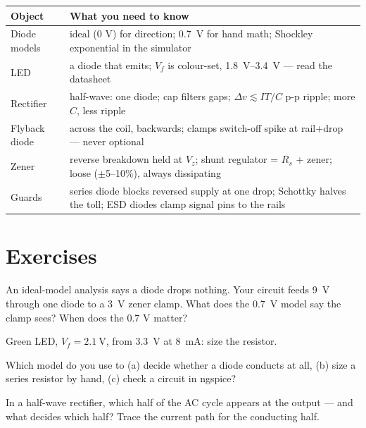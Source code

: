 \begin{center}
\begin{tabularx}{\textwidth}{l>{\raggedright\arraybackslash}X}
\toprule
\textbf{Object} & \textbf{What you need to know}\\
\midrule
Diode models & ideal (0 V) for direction; \qty{0.7}{\volt} for hand
math; Shockley exponential in the simulator \\
LED & a diode that emits; $V_f$ is colour-set,
\qty{1.8}{\volt}--\qty{3.4}{\volt} --- read the datasheet \\
Rectifier & half-wave: one diode; cap filters gaps;
$\Delta v\lesssim IT/C$ p-p ripple; more $C$, less ripple \\
Flyback diode & across the coil, backwards; clamps switch-off spike at
rail+drop --- never optional \\
Zener & reverse breakdown held at $V_z$; shunt regulator = $R_s$ +
zener; loose ($\pm$5--10\%), always dissipating \\
Guards & series diode blocks reversed supply at one drop; Schottky
halves the toll; ESD diodes clamp signal pins to the rails \\
\bottomrule
\end{tabularx}
\end{center}

\section*{Exercises}

\begin{exercise}[easy]
An ideal-model analysis says a diode drops nothing. Your circuit feeds
\qty{9}{\volt} through one diode to a \qty{3}{\volt} zener clamp. What
does the \qty{0.7}{\volt} model say the clamp sees? When does the 0.7 V
matter?
\end{exercise}

\begin{exercise}[easy]
Green LED, $V_f=\qty{2.1}{\volt}$, from \qty{3.3}{\volt} at
\qty{8}{\milli\ampere}: size the resistor.
\end{exercise}

\begin{exercise}[easy]
Which model do you use to (a) decide whether a diode conducts at all,
(b) size a series resistor by hand, (c) check a circuit in ngspice?
\end{exercise}

\begin{exercise}[easy]
In a half-wave rectifier, which half of the AC cycle appears at the
output --- and what decides which half? Trace the current path for the
conducting half.
\end{exercise}


